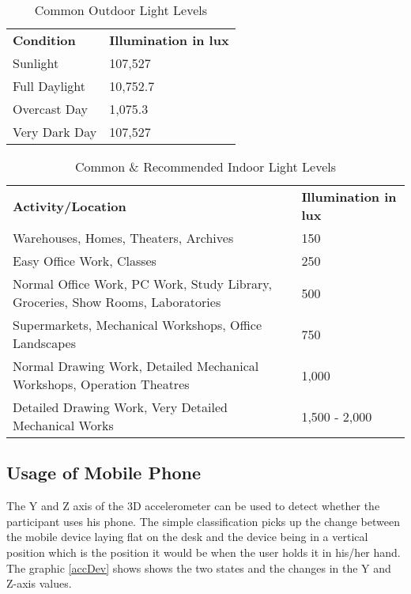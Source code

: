 \setlength{\tabcolsep}{10pt}
\renewcommand{\arraystretch}{1.5}
{

\begin{table}[!htb]
\centering
\begin{tabular}{ |p{4cm}|p{4cm}|  }
 \hline
 \rowcolor{lightgray} \multicolumn{2}{|c|}{{\bf Common Light Levels Outdoor - Daytime}} \\
 \hline
{\bf Condition} & {\bf Illumination in lux}\\
 \hline
 Sunlight   		& 107,527\\
 Full Daylight   	& 10,752.7\\
 Overcast Day	& 1,075.3\\
 Very Dark Day	& 107,527\\
 \hline
\end{tabular}
\caption{Common Outdoor Light Levels}
\label{outLight}
\end{table}

\begin{table}[!htb]
\centering
\begin{tabular}{ |p{10cm}|p{4cm}|  }
 \hline
 \rowcolor{lightgray} \multicolumn{2}{|c|}{{\bf Common and Recommended Light Levels Indoor}} \\
 \hline
{\bf Activity/Location} & {\bf Illumination in lux}\\
 \hline
 Warehouses, Homes, Theaters, Archives   																	& 150\\
 Easy Office Work, Classes   																						& 250\\
 Normal Office Work, PC Work, Study Library, Groceries, Show Rooms, Laboratories	& 500\\
 Supermarkets, Mechanical Workshops, Office Landscapes 											& 750\\
 Normal Drawing Work, Detailed Mechanical Workshops, Operation Theatres 				& 1,000\\
 Detailed Drawing Work, Very Detailed Mechanical Works 											& 1,500 - 2,000\\
 \hline
\end{tabular}
\caption{Common \& Recommended Indoor Light Levels}
\label{inLight}
\end{table}

\FloatBarrier
\clearpage

\subsection{Usage of Mobile Phone}
The Y and Z axis of the 3D accelerometer can be used to detect whether the participant uses his phone. The simple classification picks up the change between the mobile device laying flat on the desk and the device being in a vertical position which is the position it would be when the user holds it in his/her hand. The graphic \ref{accDev} shows shows the two states and the changes in the Y and Z-axis values. 

}
